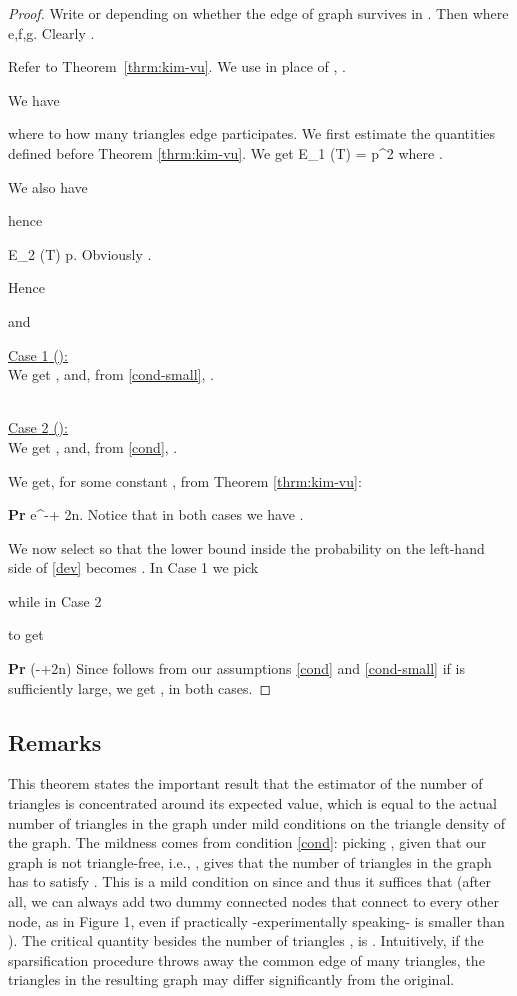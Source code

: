 \documentclass{llncs}
\newcommand{\beql}[1]{}
\newcommand{\Abs}[1]{{\left|{#1}\right|}}
\newcommand{\Mean}[1]{{\mathbb E}\left[{#1}\right]}
\newcommand{\Prob}[1]{{{\bf{Pr}}\left[{#1}\right]}}
\begin{document}
\begin{proof}
Write  or  depending on whether the edge  of graph  survives in . Then
 where
e,f,g.
Clearly .

Refer to Theorem~\ref{thrm:kim-vu}. We use  in place of , .

We have

where  to how many triangles edge  participates.
We first estimate the quantities  defined before Theorem \ref{thrm:kim-vu}.
We get \beql{e1}
{\mathbb E}_1 (T) = p^2 \Delta
\eeq
where .

We also have

hence
\beql{e2}
{\mathbb E}_2 (T) \le p.
\eeq
Obviously .

Hence

and


\noindent
\underline{ {\sc Case 1} ():}\\
We get , and, from \eqref{cond-small}, . 

\noindent \\
\underline{ {\sc Case 2} ():}\\
We get , and, from \eqref{cond}, .

We get, for some constant , from Theorem \ref{thrm:kim-vu}:
\beql{dev}
\Prob{\Abs{T-\Mean{T}} \ge c_3 \lambda^3 (\Mean{T} {\mathbb E}_{\ge 1}(T))^{1/2}} \le e^{-\lambda + 2\log n}.
\eeq
Notice that in both cases we have .

We now select  so that the lower bound inside the probability on the left-hand side of \eqref{dev} becomes .
In Case 1 we pick

while in Case 2

to get
\beql{dev1}
\Prob{\Abs{T-\Mean{T}} \ge \epsilon \Mean{T}} \le \exp(-\lambda+2\log n) 
\eeq
Since  follows from our assumptions \eqref{cond} and \eqref{cond-small} if  is sufficiently large, we get
, in both cases. 
\end{proof}


\subsection{Remarks}

This theorem states the important result that the estimator of the number of triangles is concentrated around its expected value, which 
is equal to the actual number of triangles  in the graph \cite{Tsourakakiskdd09} under mild conditions on the triangle density of the
graph. The mildness comes from condition \eqref{cond}: picking , given that our graph is not triangle-free, i.e., ,
gives that the number of triangles  in the graph has to satisfy . 
This is a mild condition on  since   and thus it suffices that  
(after all, we can always add two dummy connected nodes that connect to every other node, as in Figure 1,
even if practically -experimentally speaking-  is smaller than ). 
The critical quantity besides the number of triangles , is . Intuitively, if the sparsification
procedure throws away the common edge of many triangles, the triangles in the resulting graph may differ significantly
from the original. 
\end{document}
